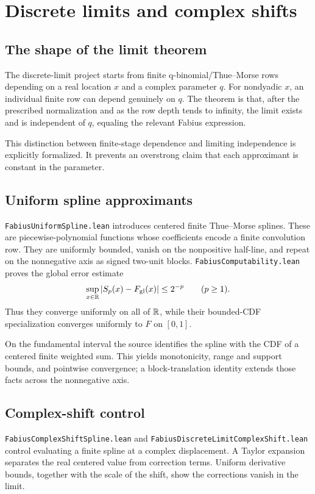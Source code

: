 \documentclass[11pt,oneside]{article}
\theoremstyle{definition}
\theoremstyle{remark}
\begin{document}
\section{Discrete limits and complex shifts}\label{ch:discrete-limit}

\subsection{The shape of the limit theorem}
The discrete-limit project starts from finite q-binomial/Thue--Morse rows depending on a real location \(x\) and a complex parameter \(q\).  For nondyadic \(x\), an individual finite row can depend genuinely on \(q\).  The theorem is that, after the prescribed normalization and as the row depth tends to infinity, the limit exists and is independent of \(q\), equaling the relevant Fabius expression.

This distinction between finite-stage dependence and limiting independence is explicitly formalized.  It prevents an overstrong claim that each approximant is constant in the parameter.

\subsection{Uniform spline approximants}
\nolinkurl{FabiusUniformSpline.lean} introduces centered finite Thue--Morse splines.  These are piecewise-polynomial functions whose coefficients encode a finite convolution row.  They are uniformly bounded, vanish on the nonpositive half-line, and repeat on the nonnegative axis as signed two-unit blocks.  \nolinkurl{FabiusComputability.lean} proves the global error estimate
\[
 \sup_{x\in\mathbb{R}}|S_p(x)-F_{\mathrm{gl}}(x)|\le 2^{-p}\qquad(p\ge1).
\]
Thus they converge uniformly on all of $\mathbb{R}$, while their bounded-CDF specialization converges uniformly to $F$ on $[0,1]$.

On the fundamental interval the source identifies the spline with the CDF of
a centered finite weighted sum.  This yields monotonicity, range and support
bounds, and pointwise convergence; a block-translation identity extends those
facts across the nonnegative axis.

\subsection{Complex-shift control}
\nolinkurl{FabiusComplexShiftSpline.lean} and \nolinkurl{FabiusDiscreteLimitComplexShift.lean} control evaluating a finite spline at a complex displacement.  A Taylor expansion separates the real centered value from correction terms.  Uniform derivative bounds, together with the scale of the shift, show the corrections vanish in the limit.
\end{document}
